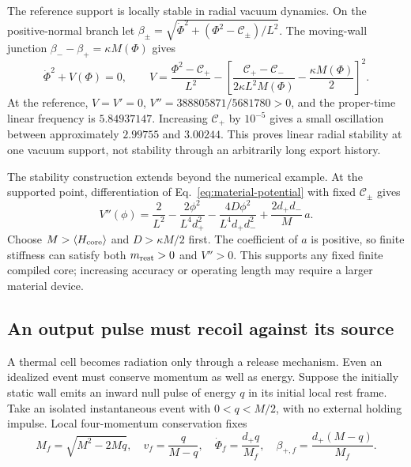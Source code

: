 The reference support is locally stable in radial vacuum dynamics.
On the positive-normal branch let
$\beta_\pm=\sqrt{\dot\Phi^2+(\Phi^2-\mathcal C_\pm)/L^2}$.
The moving-wall junction $\beta_--\beta_+=\kappa M(\Phi)$ gives
\begin{equation}\label{eq:material-potential}
 \dot\Phi^2+V(\Phi)=0,\qquad
 V=\frac{\Phi^2-\mathcal C_+}{L^2}
 -\left[\frac{\mathcal C_+-\mathcal C_-}{2\kappa L^2M(\Phi)}
                    -\frac{\kappa M(\Phi)}2\right]^2.
\end{equation}
At the reference, $V=V'=0$, $V''=388805871/5681780>0$, and the proper-time
linear frequency is $5.84937147$. Increasing $\mathcal C_+$ by $10^{-5}$
gives a small oscillation between approximately $2.99755$ and $3.00244$.
This proves linear radial stability at one vacuum support, not stability
through an arbitrarily long export history.

The stability construction extends beyond the numerical example.
At the supported point, differentiation of Eq.~\eqref{eq:material-potential}
with fixed $\mathcal C_\pm$ gives
\begin{equation}\label{eq:material-stiffness}
 V''(\phi)=\frac2{L^2}-\frac{2\phi^2}{L^4d_+^2}
 -\frac{4D\phi^2}{L^4d_+d_-^2}
 +\frac{2d_+d_-}{M}\,a .
\end{equation}
Choose $M>\langle H_{\rm core}\rangle$ and $D>\kappa M/2$ first.
The coefficient of $a$ is positive, so finite stiffness can satisfy both
$m_{\rm rest}>0$ and $V''>0$. This supports any fixed finite compiled core;
increasing accuracy or operating length may require a larger material device.

\subsection{An output pulse must recoil against its source}
\label{sec:material-recoil}

A thermal cell becomes radiation only through a release mechanism.
Even an idealized event must conserve momentum as well as energy.
Suppose the initially static wall emits an inward null pulse of energy
$q$ in its initial local rest frame. Take an isolated instantaneous event
with $0<q<M/2$, with no external holding impulse. Local four-momentum
conservation fixes
\begin{equation}\label{eq:wall-recoil}
 M_f=\sqrt{M^2-2Mq},\quad v_f=\frac q{M-q},\quad
 \dot\Phi_f=\frac{d_+q}{M_f},\quad
 \beta_{+,f}=\frac{d_+(M-q)}{M_f}.
\end{equation}

